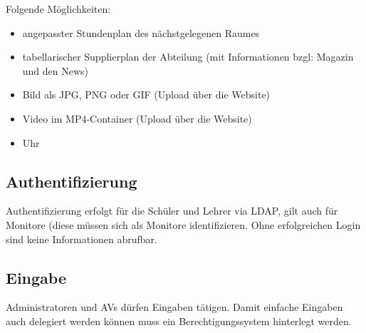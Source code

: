 Folgende Möglichkeiten:
\begin{itemize}
	\item 
		angepasster Stundenplan des nächstgelegenen Raumes
	\item
		tabellarischer Supplierplan der Abteilung (mit Informationen bzgl: Magazin und den News)
	\item
		Bild als JPG, PNG oder GIF (Upload über die Website)
	\item
		Video im MP4-Container (Upload über die Website)
	\item
		Uhr
\end{itemize}

\subsection{Authentifizierung}
Authentifizierung erfolgt für die Schüler und Lehrer via LDAP, gilt auch für Monitore (diese müssen sich als Monitore identifizieren. Ohne erfolgreichen Login sind keine Informationen abrufbar.

\subsection{Eingabe}
Administratoren und AVs dürfen Eingaben tätigen. Damit einfache Eingaben auch delegiert werden können muss ein Berechtigungssystem hinterlegt werden.

